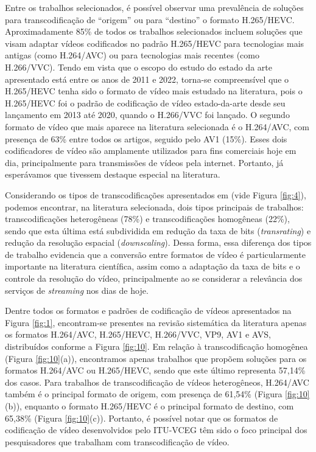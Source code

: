 Entre os trabalhos selecionados, é possível observar uma prevalência de soluções para transcodificação de ``origem'' ou para ``destino'' o formato H.265/HEVC. Aproximadamente 85\% de todos os trabalhos selecionados incluem soluções que visam adaptar vídeos codificados no padrão H.265/HEVC para tecnologias mais antigas (como H.264/AVC) ou para tecnologias mais recentes (como H.266/VVC). Tendo em vista que o escopo do estudo do estado da arte apresentado está entre os anos de 2011 e 2022, torna-se compreensível que o H.265/HEVC tenha sido o formato de vídeo mais estudado na literatura, pois o H.265/HEVC foi o padrão de codificação de vídeo estado-da-arte desde seu lançamento em 2013 até 2020, quando o H.266/VVC foi lançado. O segundo formato de vídeo que mais aparece na literatura selecionada é o H.264/AVC, com presença de 63\% entre todos os artigos, seguido pelo AV1 (15\%). Esses dois codificadores de vídeo são amplamente utilizados para fins comerciais hoje em dia, principalmente para transmissões de vídeos pela internet. Portanto, já esperávamos que tivessem destaque especial na literatura.

Considerando os tipos de transcodificações apresentados em \cite{bib:modosTranscodificacao} (vide Figura \ref{fig:4}), podemos encontrar, na literatura selecionada, dois tipos principais de trabalhos: transcodificações heterogêneas (78\%) e transcodificações homogêneas (22\%), sendo que esta última está subdividida em redução da taxa de bits (\textit{transrating}) e redução da resolução espacial (\textit{downscaling}). Dessa forma, essa diferença dos tipos de trabalho evidencia que a conversão entre formatos de vídeo é particularmente importante na literatura científica, assim como a adaptação da taxa de bits e o controle da resolução do vídeo, principalmente ao se considerar a relevância dos serviços de \textit{streaming} nos dias de hoje.

Dentre todos os formatos e padrões de codificação de vídeos apresentados na Figura \ref{fig:1}, encontram-se presentes na revisão sistemática da literatura apenas os formatos H.264/AVC, H.265/HEVC, H.266/VVC, VP9, AV1 e AVS, distribuídos conforme a Figura \ref{fig:10}. Em relação à transcodificação homogênea (Figura \ref{fig:10}(a)), encontramos apenas trabalhos que propõem soluções para os formatos H.264/AVC ou H.265/HEVC, sendo que este último representa 57,14\% dos casos. Para trabalhos de transcodificação de vídeos heterogêneos, H.264/AVC também é o principal formato de origem, com presença de 61,54\% (Figura \ref{fig:10}(b)), enquanto o formato H.265/HEVC é o principal formato de destino, com 65,38\% (Figura \ref{fig:10}(c)). Portanto, é possível notar que os formatos de codificação de vídeo desenvolvidos pelo ITU-VCEG têm sido o foco principal dos pesquisadores que trabalham com transcodificação de vídeo.


